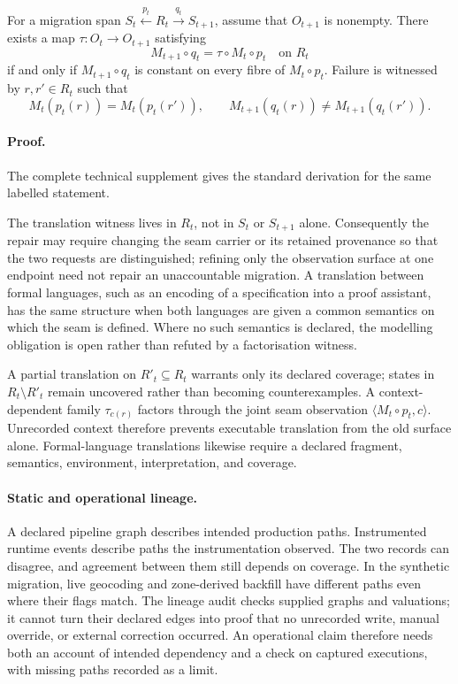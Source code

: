 \documentclass[twocolumn,envcountsect,envcountsame,natbib]{svjour3}
\begin{document}
\begin{proposition}\label{ex:prop:translation-factorisation}
For a migration span $S_t\xleftarrow{p_t}R_t\xrightarrow{q_t}S_{t+1}$, assume that $O_{t+1}$ is nonempty. There exists a map $\tau:O_t\to O_{t+1}$ satisfying
\[
M_{t+1}\circ q_t=\tau\circ M_t\circ p_t
\quad\text{on }R_t
\]
if and only if $M_{t+1}\circ q_t$ is constant on every fibre of $M_t\circ p_t$. Failure is witnessed by $r,r'\in R_t$ such that
\[
M_t(p_t(r))=M_t(p_t(r')),
\qquad
M_{t+1}(q_t(r))\neq M_{t+1}(q_t(r')).
\]
\end{proposition}

\paragraph{Proof.} The complete technical supplement gives the standard derivation for the same labelled statement.

The translation witness lives in $R_t$, not in $S_t$ or $S_{t+1}$ alone. Consequently the repair may require changing the seam carrier or its retained provenance so that the two requests are distinguished; refining only the observation surface at one endpoint need not repair an unaccountable migration. A translation between formal languages, such as an encoding of a specification into a proof assistant, has the same structure when both languages are given a common semantics on which the seam is defined. Where no such semantics is declared, the modelling obligation is open rather than refuted by a factorisation witness.

A partial translation on $R'_t\subseteq R_t$ warrants only its declared coverage; states in $R_t\setminus R'_t$ remain uncovered rather than becoming counterexamples. A context-dependent family $\tau_{c(r)}$ factors through the joint seam observation $\langle M_t\circ p_t,c\rangle$. Unrecorded context therefore prevents executable translation from the old surface alone. Formal-language translations likewise require a declared fragment, semantics, environment, interpretation, and coverage.

\paragraph{Static and operational lineage.} A declared pipeline graph describes intended production paths. Instrumented runtime events describe paths the instrumentation observed. The two records can disagree, and agreement between them still depends on coverage. In the synthetic migration, live geocoding and zone-derived backfill have different paths even where their flags match. The lineage audit checks supplied graphs and valuations; it cannot turn their declared edges into proof that no unrecorded write, manual override, or external correction occurred. An operational claim therefore needs both an account of intended dependency and a check on captured executions, with missing paths recorded as a limit.
\end{document}
